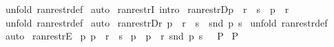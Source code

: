 \begin{isabellebody}
\ {\isacharparenleft}unfold\ ran{\isacharunderscore}restr{\isacharunderscore}def{\isacharparenright}\isanewline
{}\isamarkupfalse%
\ auto\isanewline
{}\isamarkupfalse%
%
\endisatagproof
{\isafoldproof}%
%
\isadelimproof
\isanewline
%
\endisadelimproof
{}\isamarkupfalse%
\ ran{\isacharunderscore}restrI\ {\isacharbrackleft}intro{\isacharbang}{\isacharbrackright}\isanewline
\isanewline
{}\isamarkupfalse%
\ ran{\isacharunderscore}restrD{}{\isacharcolon}{\isachardoublequoteopen}p\ {\isacharcolon}\ {\isacharparenleft}r\ {\isacharcolon}{\isachargreater}\ s{\isacharparenright}\ {\isacharequal}{\isacharequal}{\isachargreater}\ p\ {\isacharcolon}\ r{\isachardoublequoteclose}\isanewline
%
\isadelimproof
%
\endisadelimproof
%
\isatagproof
{}\isamarkupfalse%
\ {\isacharparenleft}unfold\ ran{\isacharunderscore}restr{\isacharunderscore}def{\isacharparenright}\isanewline
{}\isamarkupfalse%
\ auto\isanewline
{}\isamarkupfalse%
%
\endisatagproof
{\isafoldproof}%
%
\isadelimproof
\isanewline
%
\endisadelimproof
\isanewline
\isanewline
{}\isamarkupfalse%
\ ran{\isacharunderscore}restrD{}{\isacharcolon}{\isachardoublequoteopen}{\isacharbang}{\isacharbang}r{\isachardot}\ p\ {\isacharcolon}\ {\isacharparenleft}r\ {\isacharcolon}{\isachargreater}\ s{\isacharparenright}\ {\isacharequal}{\isacharequal}{\isachargreater}\ snd\ p\ {\isacharcolon}s{\isachardoublequoteclose}\isanewline
%
\isadelimproof
%
\endisadelimproof
%
\isatagproof
{}\isamarkupfalse%
\ {\isacharparenleft}unfold\ ran{\isacharunderscore}restr{\isacharunderscore}def{\isacharparenright}\isanewline
{}\isamarkupfalse%
\ auto\isanewline
{}\isamarkupfalse%
%
\endisatagproof
{\isafoldproof}%
%
\isadelimproof
\isanewline
%
\endisadelimproof
\isanewline
{}\isamarkupfalse%
\ ran{\isacharunderscore}restrE{}{\isacharcolon}\isanewline
{}\ p{}{\isacharcolon}\ {\isachardoublequoteopen}p\ {\isacharcolon}\ {\isacharparenleft}r\ {\isacharcolon}{\isachargreater}\ s{\isacharparenright}{\isachardoublequoteclose}\isanewline
{}\ p{}{\isacharcolon}\ {\isachardoublequoteopen}{\isacharbrackleft}{\isacharbar}\ p\ {\isacharcolon}\ r{\isacharsemicolon}\ snd\ p\ {\isacharcolon}s\ {\isacharbar}{\isacharbrackright}\ {\isacharequal}{\isacharequal}{\isachargreater}\ P{\isachardoublequoteclose}\isanewline
{}\ {\isachardoublequoteopen}P{\isachardoublequoteclose}\isanewline

\end{isabellebody}
